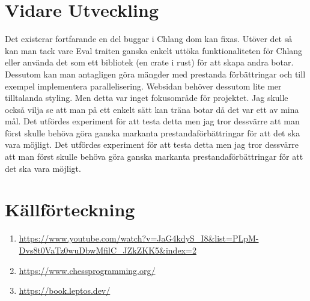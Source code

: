 \documentclass{article}
\begin{document}
	\newpage
	\section{Vidare Utveckling}
    Det existerar fortfarande en del buggar i Chlang dom kan fixas. Utöver det så kan man tack vare Eval traiten ganska enkelt uttöka funktionaliteten för Chlang eller använda det som ett bibliotek (en crate i rust) för att skapa andra botar.
    Dessutom kan man antagligen göra mängder med prestanda förbättringar och till exempel implementera parallelisering.
    Websidan behöver dessutom lite mer tilltalanda styling. Men detta var inget fokusområde för projektet.
    Jag skulle också vilja se att man på ett enkelt sätt kan träna botar då det var ett av mina mål. Det utfördes experiment för att testa detta men jag tror dessvärre att man först skulle behöva göra ganska markanta prestandaförbättringar för att det ska vara möjligt. Det utfördes experiment för att testa detta men jag tror dessvärre att man först skulle behöva göra ganska markanta prestandaförbättringar för att det ska vara möjligt. 
	
	\newpage
	\section{Källförteckning}
    \begin{enumerate}
     \item \url{https://www.youtube.com/watch?v=JaG4kdyS_I8&list=PLpM-Dvs8t0VaTz0wuDbwMfilC_JZkZKK5&index=2} 
    \item \url{https://www.chessprogramming.org/}
    \item \url{https://book.leptos.dev/}
    \end{enumerate}
\end{document}
